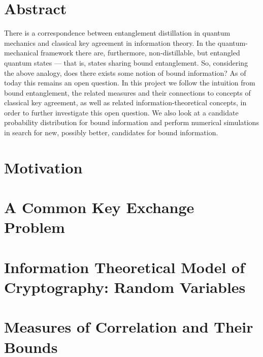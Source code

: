 \documentclass[titlepage]{report}
\theoremstyle{remark}
\begin{document}


\chapter*{Abstract}
There is a correspondence between entanglement distillation in quantum mechanics and classical key agreement in information theory. 
In the quantum-mechanical framework there are, furthermore, non-distillable, but entangled quantum states --- that is, states sharing bound entanglement. 
So, considering the above analogy, does there exists some notion of bound information? As of today this remains an open question.
In this project we follow the intuition from bound entanglement, the related measures and their connections to concepts of classical key agreement, as well as related information-theoretical concepts, in order to further investigate this open question.
We also look at a candidate probability distribution for bound information and perform numerical simulations in search for new, possibly better, candidates for bound information.


\tableofcontents

%

\chapter{Motivation}

		
 \chapter{A Common Key Exchange Problem}
 
\chapter{Information Theoretical Model of Cryptography: Random Variables}

\chapter{Measures of Correlation and Their Bounds}

\end{document}
